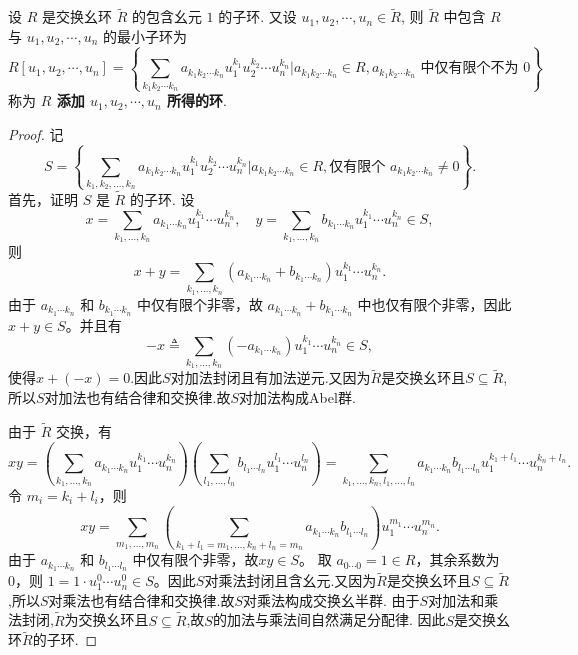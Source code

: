\documentclass[../../main.tex]{subfiles}%
\begin{document}
\begin{theorem}
设 \( R \) 是交换幺环 \( \widetilde{R} \) 的包含幺元 \( 1 \) 的子环. 又设 \( u_1, u_2, \cdots, u_n \in \widetilde{R} \), 则 \( \widetilde{R} \) 中包含 \( R \) 与 \( u_1, u_2, \cdots, u_n \) 的最小子环为
\[
R[u_1, u_2, \cdots, u_n] = \left\{ \sum_{k_1 k_2 \cdots k_n} a_{k_1 k_2 \cdots k_n} u_1^{k_1} u_2^{k_2} \cdots u_n^{k_n} \bigg| a_{k_1 k_2 \cdots k_n} \in R, a_{k_1 k_2 \cdots k_n} \text{ 中仅有限个不为 } 0 \right\}
\]
称为 \textbf{\( R \) 添加 \( u_1, u_2, \cdots, u_n \) 所得的环}.
\end{theorem}
\begin{proof}

记
\[
S  = \left\{ \sum_{k_1, k_2, \ldots, k_n} a_{k_1 k_2 \cdots k_n} u_1^{k_1} u_2^{k_2} \cdots u_n^{k_n} \bigg| a_{k_1 k_2 \cdots k_n} \in R, \text{仅有限个 } a_{k_1 k_2 \cdots k_n} \neq 0 \right\}.
\]
首先，证明 \( S \) 是 \( \widetilde{R} \) 的子环.
设
\[
x = \sum_{k_1, \ldots, k_n} a_{k_1 \cdots k_n} u_1^{k_1} \cdots u_n^{k_n}, \quad y = \sum_{k_1, \ldots, k_n} b_{k_1 \cdots k_n} u_1^{k_1} \cdots u_n^{k_n} \in S,
\]
则
\[
x + y = \sum_{k_1, \ldots, k_n} (a_{k_1 \cdots k_n} + b_{k_1 \cdots k_n}) u_1^{k_1} \cdots u_n^{k_n}.
\]
由于 \( a_{k_1 \cdots k_n} \) 和 \( b_{k_1 \cdots k_n} \) 中仅有限个非零，故 \( a_{k_1 \cdots k_n} + b_{k_1 \cdots k_n} \) 中也仅有限个非零，因此 \( x + y \in S \)。并且有
\[
-x \triangleq  \sum_{k_1, \ldots, k_n}(-a_{k_1 \cdots k_n}) u_1^{k_1} \cdots u_n^{k_n} \in S,
\]
使得$x+(-x)=0.$因此$S$对加法封闭且有加法逆元.又因为$\widetilde{R}$是交换幺环且$S\subseteq \widetilde{R}$,所以$S$对加法也有结合律和交换律.故$S$对加法构成Abel群.

由于 \( \widetilde{R} \) 交换，有
\[
xy = \left( \sum_{k_1, \ldots, k_n} a_{k_1 \cdots k_n} u_1^{k_1} \cdots u_n^{k_n} \right) \left( \sum_{l_1, \ldots, l_n} b_{l_1 \cdots l_n} u_1^{l_1} \cdots u_n^{l_n} \right)
= \sum_{k_1, \ldots, k_n, l_1, \ldots, l_n} a_{k_1 \cdots k_n} b_{l_1 \cdots l_n} u_1^{k_1 + l_1} \cdots u_n^{k_n + l_n}.
\]
令 \( m_i = k_i + l_i \)，则
\[
xy = \sum_{m_1, \ldots, m_n} \left( \sum_{k_1 + l_1 = m_1, \ldots, k_n + l_n = m_n} a_{k_1 \cdots k_n} b_{l_1 \cdots l_n} \right) u_1^{m_1} \cdots u_n^{m_n}.
\]
由于 \( a_{k_1 \cdots k_n} \) 和 \( b_{l_1 \cdots l_n} \) 中仅有限个非零，故\( xy \in S \)。
取 \( a_{0 \cdots 0} = 1 \in R \)，其余系数为 0，则 \( 1 = 1 \cdot u_1^0 \cdots u_n^0 \in S \)。因此$S$对乘法封闭且含幺元.又因为$\widetilde{R}$是交换幺环且$S\subseteq \widetilde{R}$,所以$S$对乘法也有结合律和交换律.故$S$对乘法构成交换幺半群.
由于$S$对加法和乘法封闭,$\widetilde{R}$为交换幺环且$S\subseteq \widetilde{R}$,故$S$的加法与乘法间自然满足分配律.
因此$S$是交换幺环$\widetilde{R}$的子环.


\end{proof}
\end{document}
